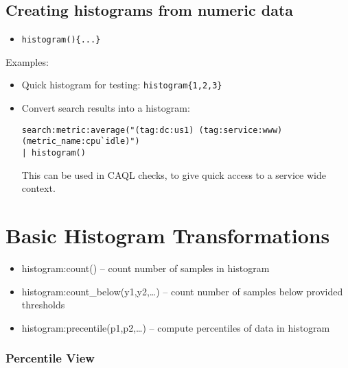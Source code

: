 \documentclass[11pt]{article}
\providecommand{\tightlist}{%
      \setlength{\itemsep}{0pt}\setlength{\parskip}{0pt}}
\begin{document}
    \hypertarget{creating-histograms-from-numeric-data}{%
\subsection{Creating histograms from numeric
data}\label{creating-histograms-from-numeric-data}}

\begin{itemize}
\tightlist
\item
  \texttt{histogram()\{...\}}
\end{itemize}

Examples:

\begin{itemize}
\item
  Quick histogram for testing: \texttt{histogram\{1,2,3\}}
\item
  Convert search results into a histogram:

\begin{verbatim}
search:metric:average("(tag:dc:us1) (tag:service:www) (metric_name:cpu`idle)") 
| histogram()
\end{verbatim}

  This can be used in CAQL checks, to give quick access to a service
  wide context.
\end{itemize}

    \hypertarget{basic-histogram-transformations}{%
\section{Basic Histogram
Transformations}\label{basic-histogram-transformations}}

\begin{itemize}
\tightlist
\item
  histogram:count() -- count number of samples in histogram
\item
  histogram:count\_below(y1,y2,\ldots{}) -- count number of samples
  below provided thresholds
\item
  histogram:precentile(p1,p2,\ldots{}) -- compute percentiles of data in
  histogram
\end{itemize}

    \hypertarget{percentile-view}{%
\subsubsection{Percentile View}\label{percentile-view}}
\end{document}
